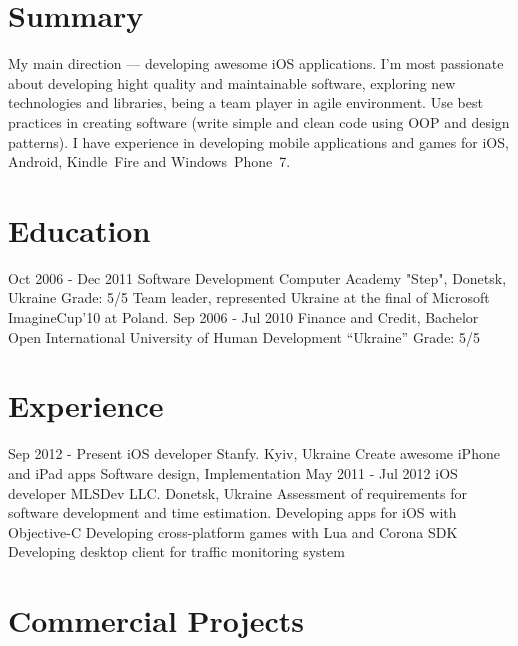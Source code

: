\documentclass[11pt,a4paper]{moderncv}
\begin{document}
\maketitle

\section{Summary}
\cvline
  {}
  {My main direction --- developing awesome iOS applications.\newline{}
  I'm most passionate about developing hight quality and maintainable software, exploring new technologies and libraries, being a team player in agile environment. Use best practices in creating software (write simple and clean code using OOP and design patterns). I have experience in developing mobile applications and games for iOS, Android, Kindle~Fire and Windows~Phone~7.{}}

\section{Education}
  \cventry
    {Oct 2006 - Dec 2011}
    {Software Development}
    {Computer Academy "Step", Donetsk, Ukraine}
    {Grade: 5/5}{}
    {Team leader, represented Ukraine at the final of Microsoft ImagineCup'10 at Poland.}
  \cventry
    {Sep 2006 - Jul 2010}
    {Finance and Credit, Bachelor}
    {\newline Open International University of Human Development “Ukraine”}
    {Grade: 5/5}{}{}

\section{Experience}
\cventry
  {Sep 2012 - Present}
  {iOS developer}
  {Stanfy. Kyiv, Ukraine}
  {}{}
  {Create awesome iPhone and iPad apps
  \newline Software design, Implementation}
\cventry
  {May 2011 - Jul 2012}
  {iOS developer}
  {MLSDev LLC. Donetsk, Ukraine}
  {}{}
  {Assessment of requirements for software development and time estimation. 
  \newline Developing apps for iOS with Objective-C
  \newline Developing cross-platform games with Lua and Corona SDK
  \newline Developing desktop client for traffic monitoring system}

\section{Commercial Projects}
\end{document}
